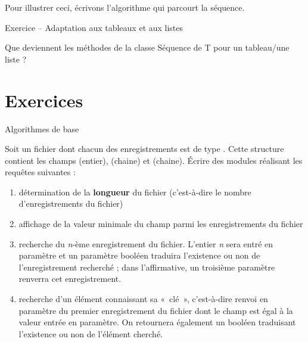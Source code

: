 
Pour illustrer ceci, écrivons l'algorithme qui parcourt
la séquence.


\bigskip

\begin{Emphase}{Exercice – Adaptation aux tableaux et aux listes}

Que deviennent les méthodes de la classe Séquence de T pour un
tableau/une liste ?
\end{Emphase}

\section{Exercices}

\begin{Exercice}{Algorithmes de base}
	
	Soit un fichier dont chacun des enregistrements est de type
	. Cette structure contient les champs
	 (entier),  (chaine)
	et  (chaine). Écrire des modules réalisant
	les requêtes suivantes :

	\begin{enumerate}[label=\alph*)]
		\item 
			détermination de la \textbf{longueur} du fichier (c’est-à-dire le nombre
			d’enregistrements du fichier)
		\item 
			affichage de la valeur minimale du champ 
			parmi les enregistrements du fichier
		\item
			recherche du \textit{n}{}-ème enregistrement du fichier. L’entier
			\textit{n} sera entré en paramètre et un paramètre booléen traduira
			l’existence ou non de l’enregistrement recherché ; dans l’affirmative,
			un troisième paramètre renverra cet enregistrement.
		\item 
			recherche d’un élément connaissant sa «~clé~», c’est-à-dire renvoi en
			paramètre du premier enregistrement du fichier dont le champ
			 est égal à la valeur 
			entrée en paramètre. On retournera également un booléen
			traduisant l’existence ou non de l’élément cherché. 
	\end{enumerate}
\end{Exercice}

